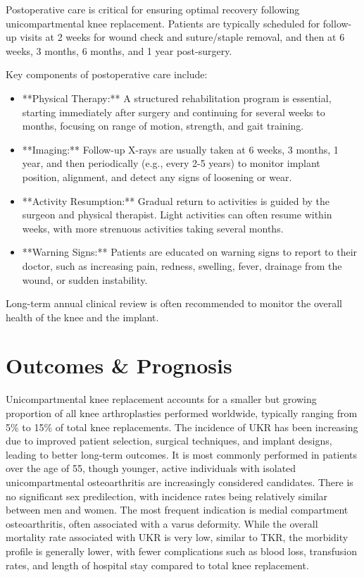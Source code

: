 Postoperative care is critical for ensuring optimal recovery following unicompartmental knee replacement. Patients are typically scheduled for follow-up visits at 2 weeks for wound check and suture/staple removal, and then at 6 weeks, 3 months, 6 months, and 1 year post-surgery. 

Key components of postoperative care include:

\begin{itemize}
  \item **Physical Therapy:** A structured rehabilitation program is essential, starting immediately after surgery and continuing for several weeks to months, focusing on range of motion, strength, and gait training.
  
  \item **Imaging:** Follow-up X-rays are usually taken at 6 weeks, 3 months, 1 year, and then periodically (e.g., every 2-5 years) to monitor implant position, alignment, and detect any signs of loosening or wear.
  
  \item **Activity Resumption:** Gradual return to activities is guided by the surgeon and physical therapist. Light activities can often resume within weeks, with more strenuous activities taking several months.
  
  \item **Warning Signs:** Patients are educated on warning signs to report to their doctor, such as increasing pain, redness, swelling, fever, drainage from the wound, or sudden instability.
\end{itemize}

Long-term annual clinical review is often recommended to monitor the overall health of the knee and the implant.

\section*{Outcomes \& Prognosis}
Unicompartmental knee replacement accounts for a smaller but growing proportion of all knee arthroplasties performed worldwide, typically ranging from 5\% to 15\% of total knee replacements. The incidence of UKR has been increasing due to improved patient selection, surgical techniques, and implant designs, leading to better long-term outcomes. It is most commonly performed in patients over the age of 55, though younger, active individuals with isolated unicompartmental osteoarthritis are increasingly considered candidates. There is no significant sex predilection, with incidence rates being relatively similar between men and women. The most frequent indication is medial compartment osteoarthritis, often associated with a varus deformity. While the overall mortality rate associated with UKR is very low, similar to TKR, the morbidity profile is generally lower, with fewer complications such as blood loss, transfusion rates, and length of hospital stay compared to total knee replacement.


